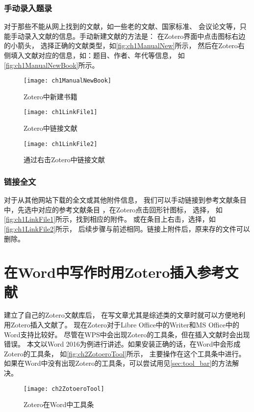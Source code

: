 \documentclass[cn,11pt,chinese]{elegantbook}
\begin{document}
	\subsection{手动录入题录}\label{sec:ManualImport}
	对于那些不能从网上找到的文献，如一些老的文献、国家标准、
	会议论文等，只能手动录入文献的信息。手动新建文献的方法是：
	在Zotero界面中点击\menu{+}图标右边的小箭头，
	选择正确的文献类型，如\autoref{fig:ch1ManualNew}所示，
	然后在Zotero右侧填入文献对应的信息，如：题目、作者、年代等信息，
	如\autoref{fig:ch1ManualNewBook}所示。
			\begin{figure}
					\centering
					\begin{minipage}[t]{\dimexpr0.5\textwidth-4em}
					\centering
					\texttt{[image: ch1ManualNewBook]}
					\caption{Zotero中新建书籍}
					\label{fig:ch1ManualNewBook}
				\end{minipage}	
				\hspace{2cm}
				\begin{minipage}[t]{\dimexpr0.5\textwidth-4em}
					\centering
					\texttt{[image: ch1LinkFile1]}
					\caption{Zotero中链接文献}
					\label{fig:ch1LinkFile1}
				\end{minipage}	
			\end{figure}
			\begin{figure}
				\centering
				\texttt{[image: ch1LinkFile2]}
				\caption{通过右击Zotero中链接文献}
				\label{fig:ch1LinkFile2}
			\end{figure}
		\subsection{链接全文}\label{sec:linkFulltex}
				对于从其他网站下载的全文或其他附件信息，
				我们可以手动链接到参考文献条目中，先选中对应的参考文献条目
				，在Zotero点击回形针图标，
				选择，
				如\autoref{fig:ch1LinkFile1}所示，找到相应的附件。
				或在条目上右击，选择，如\autoref{fig:ch1LinkFile2}所示，
				后续步骤与前述相同。链接上附件后，原来存的文件可以删除。


\chapter{在Word中写作时用Zotero插入参考文献}\label{ch:insert}
		建立了自己的Zotero文献库后，
		在写文章尤其是综述类的文章时就可以方便地利用Zotero插入文献了。
		现在Zotero对于Libre Office中的Writer和MS Office中的Word支持比较好。
		尽管在WPS中会出现Zotero的工具条，但在插入文献时会出现错误。
		本文以Word 2016为例进行讲述。如果安装正确的话，在Word中会形成Zotero的工具条，
		如\autoref{fig:ch2ZotoeroTool}所示，
		主要操作在这个工具条中进行。
		如果在Word中没有出现Zotero的工具条，可以尝试用见\cref{sec:tool_bar}的方法解决。
			\begin{figure}[htbp]
				\centering
				\texttt{[image: ch2ZotoeroTool]}
				\caption{Zotero在Word中工具条}
				\label{fig:ch2ZotoeroTool}
			\end{figure}
		
\end{document}
